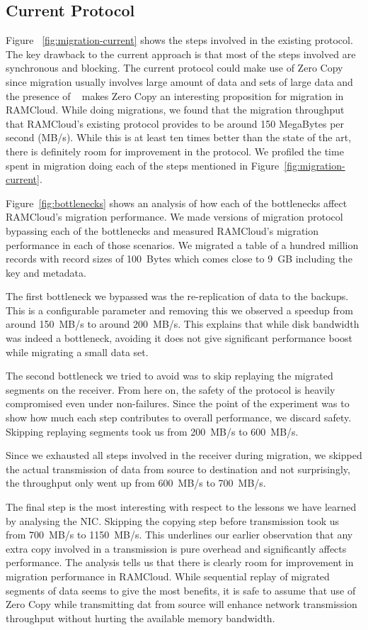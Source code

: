 \subsection{Current Protocol}
Figure ~\ref{fig:migration-current} shows the steps involved in the existing protocol. The key drawback to the current approach is that 
most of the steps involved are synchronous and blocking. The current protocol could make use of Zero Copy since migration usually involves 
large amount of data and sets of large data and the presence of ~\cite{ramcloudtx} makes Zero Copy an interesting proposition 
for migration in RAMCloud. While doing migrations, we found that the migration throughput that RAMCloud's existing protocol provides to 
be around 150 MegaBytes per second (MB/s). While this is at least ten times better than the state of the art, there is definitely room for improvement in the protocol.
We profiled the time spent in migration doing each of the steps mentioned in Figure~\ref{fig:migration-current}.

Figure~\ref{fig:bottlenecks} shows an analysis of how each of the bottlenecks affect RAMCloud's migration performance. We made versions of migration 
protocol bypassing each of the bottlenecks and measured RAMCloud's migration performance in each of those scenarios. We migrated a table of a hundred million 
records with record sizes of 100~Bytes which comes close to 9~GB including the key and metadata.

The first bottleneck we bypassed was the re-replication of data to the backups. This is a configurable parameter and removing this we observed a speedup from around 150~MB/s to around 
200~MB/s. This explains that while disk bandwidth was indeed a bottleneck, avoiding it does not give significant performance boost while migrating a small data set.

The second bottleneck we tried to avoid was to skip replaying the migrated segments on the receiver. From here on, the safety of the protocol is heavily compromised even under 
 non-failures. Since the point of the experiment was to show how much each step contributes to overall performance, we discard safety. Skipping replaying segments took us from 
 200~MB/s to 600~MB/s. 

Since we exhausted all steps involved in the receiver during migration, we skipped the actual transmission of data from source to destination and not surprisingly, the throughput 
only went up from 600~MB/s to 700~MB/s. 

The final step is the most interesting with respect to the lessons we have learned by analysing the NIC. Skipping the copying step before transmission took us from 700~MB/s to 
1150~MB/s. This underlines our earlier observation that any extra copy involved in a transmission is pure overhead and significantly affects performance. 
The analysis tells us that there is clearly room for improvement in migration performance in RAMCloud. While sequential replay of migrated segments of data seems to give the most benefits, 
it is safe to assume that use of Zero Copy while transmitting dat from source will enhance network transmission throughput without hurting the available memory bandwidth.

